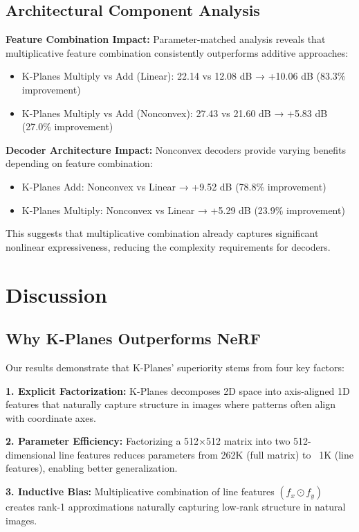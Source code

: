 \documentclass{article}
\begin{document}
\subsection{Architectural Component Analysis}

\textbf{Feature Combination Impact:} Parameter-matched analysis reveals that multiplicative feature combination consistently outperforms additive approaches:
\begin{itemize}
\item K-Planes Multiply vs Add (Linear): 22.14 vs 12.08 dB → +10.06 dB (83.3\% improvement)
\item K-Planes Multiply vs Add (Nonconvex): 27.43 vs 21.60 dB → +5.83 dB (27.0\% improvement)
\end{itemize}

\textbf{Decoder Architecture Impact:} Nonconvex decoders provide varying benefits depending on feature combination:
\begin{itemize}
\item K-Planes Add: Nonconvex vs Linear → +9.52 dB (78.8\% improvement)
\item K-Planes Multiply: Nonconvex vs Linear → +5.29 dB (23.9\% improvement)
\end{itemize}

This suggests that multiplicative combination already captures significant nonlinear expressiveness, reducing the complexity requirements for decoders.

\section{Discussion}

\subsection{Why K-Planes Outperforms NeRF}

Our results demonstrate that K-Planes' superiority stems from four key factors:

\textbf{1. Explicit Factorization:} K-Planes decomposes 2D space into axis-aligned 1D features that naturally capture structure in images where patterns often align with coordinate axes.

\textbf{2. Parameter Efficiency:} Factorizing a 512×512 matrix into two 512-dimensional line features reduces parameters from 262K (full matrix) to ~1K (line features), enabling better generalization.

\textbf{3. Inductive Bias:} Multiplicative combination of line features $(f_x \odot f_y)$ creates rank-1 approximations naturally capturing low-rank structure in natural images.
\end{document}
